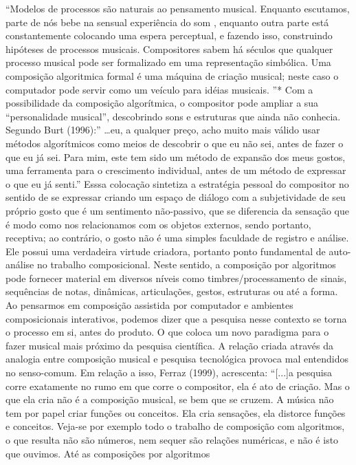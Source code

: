 \documentclass{ppgmus}
\begin{document}
“Modelos de processos são naturais ao pensamento musical. Enquanto escutamos, parte de nós bebe na 
sensual experiência do som , enquanto outra parte está constantemente colocando uma espera perceptual, 
e fazendo isso, construindo hipóteses de processos musicais. Compositores sabem há séculos que qualquer 
processo musical pode ser formalizado em uma representação simbólica. Uma composição algoritmica formal 
é uma máquina de criação musical; neste caso o computador pode servir como um veículo para idéias musicais.
”*
Com a possibilidade da composição algorítmica, o compositor pode ampliar a sua “personalidade musical”, 
descobrindo sons e estruturas que ainda não conhecia. Segundo Burt (1996):” …eu, a qualquer preço, acho 
muito mais válido usar métodos algorítmicos como meios de descobrir o que eu não sei, antes de fazer o 
que eu já sei. Para mim, este tem sido um método de expansão dos meus gostos, uma ferramenta para o 
crescimento individual, antes de um método de expressar o que eu já senti.” 
Esssa colocação sintetiza a estratégia pessoal do compositor no sentido de se expressar criando um 
espaço de diálogo com a subjetividade de seu próprio gosto que é um sentimento não-passivo, que se 
diferencia da sensação que é modo como nos relacionamos com os objetos externos, sendo portanto, 
receptiva; ao contrário, o gosto não é uma simples faculdade de registro e análise. 
Ele possui uma verdadeira virtude criadora, portanto ponto fundamental de auto-análise no trabalho 
composicional. Neste sentido, a composição por algoritmos pode fornecer material em diversos níveis 
como timbres/processamento de sinais, sequências de notas, dinâmicas, articulações, gestos, estruturas 
ou até a forma.
Ao pensarmos em composição assistida por computador e ambientes composicionais interativos, podemos dizer 
que a pesquisa nesse contexto se torna o processo em si, antes do produto. O que coloca um novo paradigma 
para o fazer musical mais próximo da pesquisa científica. A relação criada através da analogia entre 
composição musical e pesquisa tecnológica provoca mal entendidos no senso-comum. Em relação a isso, 
Ferraz (1999), acrescenta:
“[...]a pesquisa corre exatamente no rumo em que corre o compositor, ela é ato de criação. 
Mas o que ela cria não é a composição musical, se bem que se cruzem. A música não tem por papel 
criar funções ou conceitos. Ela cria sensações, ela distorce funções e conceitos. 
Veja-se por exemplo todo o trabalho de composição com algoritmos, o que resulta não são números, 
nem sequer são relações numéricas, e não é isto que ouvimos. Até as composições por algoritmos 
\end{document}
